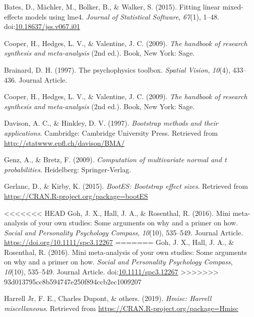 \documentclass[
  man]{apa6}
\begin{document}
\leavevmode\hypertarget{ref-R-lme4}{}%
Bates, D., Mächler, M., Bolker, B., \& Walker, S. (2015). Fitting linear mixed-effects models using lme4. \emph{Journal of Statistical Software}, \emph{67}(1), 1--48. doi:\href{https://doi.org/10.18637/jss.v067.i01}{10.18637/jss.v067.i01}

\leavevmode\hypertarget{ref-Cooper_2009_handbook}{}%
Cooper, H., Hedges, L. V., \& Valentine, J. C. (2009). \emph{The handbook of research synthesis and meta-analysis} (2nd ed.). Book, New York: Sage.

\leavevmode\hypertarget{ref-Brainard_1997}{}%
Brainard, D. H. (1997). The psychophysics toolbox. \emph{Spatial Vision}, \emph{10}(4), 433--436. Journal Article.

\leavevmode\hypertarget{ref-Cooper_2009_handbook}{}%
Cooper, H., Hedges, L. V., \& Valentine, J. C. (2009). \emph{The handbook of research synthesis and meta-analysis} (2nd ed.). Book, New York: Sage.

\leavevmode\hypertarget{ref-R-boot}{}%
Davison, A. C., \& Hinkley, D. V. (1997). \emph{Bootstrap methods and their applications}. Cambridge: Cambridge University Press. Retrieved from \url{http://statwww.epfl.ch/davison/BMA/}

\leavevmode\hypertarget{ref-R-mvtnorm}{}%
Genz, A., \& Bretz, F. (2009). \emph{Computation of multivariate normal and t probabilities}. Heidelberg: Springer-Verlag.

\leavevmode\hypertarget{ref-R-bootES}{}%
Gerlanc, D., \& Kirby, K. (2015). \emph{BootES: Bootstrap effect sizes}. Retrieved from \url{https://CRAN.R-project.org/package=bootES}

\leavevmode\hypertarget{ref-Goh_2016_mini}{}%
<<<<<<< HEAD
Goh, J. X., Hall, J. A., \& Rosenthal, R. (2016). Mini meta-analysis of your own studies: Some arguments on why and a primer on how. \emph{Social and Personality Psychology Compass}, \emph{10}(10), 535--549. Journal Article. \url{https://doi.org/10.1111/spc3.12267}
=======
Goh, J. X., Hall, J. A., \& Rosenthal, R. (2016). Mini meta-analysis of your own studies: Some arguments on why and a primer on how. \emph{Social and Personality Psychology Compass}, \emph{10}(10), 535--549. Journal Article. doi:\href{https://doi.org/10.1111/spc3.12267}{10.1111/spc3.12267}
>>>>>>> 93d013795cc8b594747e250f894ccb2ec1009207

\leavevmode\hypertarget{ref-R-Hmisc}{}%
Harrell Jr, F. E., Charles Dupont, \& others. (2019). \emph{Hmisc: Harrell miscellaneous}. Retrieved from \url{https://CRAN.R-project.org/package=Hmisc}
\end{document}
